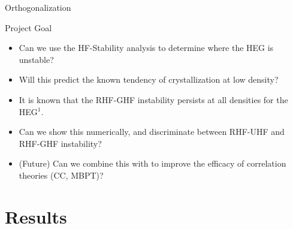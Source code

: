 \documentclass[10pt]{beamer}
\begin{document}
{{{{{{{{{{{{\begin{frame}{Orthogonalization}
\end{frame}


{%
\begin{frame}{Project Goal}
	\begin{itemize}[<+->]
		\item{Can we use the HF-Stability analysis to determine where the HEG is unstable?}
		\item{Will this predict the known tendency of crystallization at low density?}
		\item{It is known that the RHF-GHF instability persists at all densities for the HEG$^1$.}
		\item{Can we show this numerically, and discriminate between RHF-UHF and RHF-GHF instability?}
		\item{(Future) Can we combine this with to improve the efficacy of correlation theories (CC, MBPT)?}
	\end{itemize}
\end{frame}



\section{Results}

{%

}}}}}}}}}}}}}}
\end{document}
